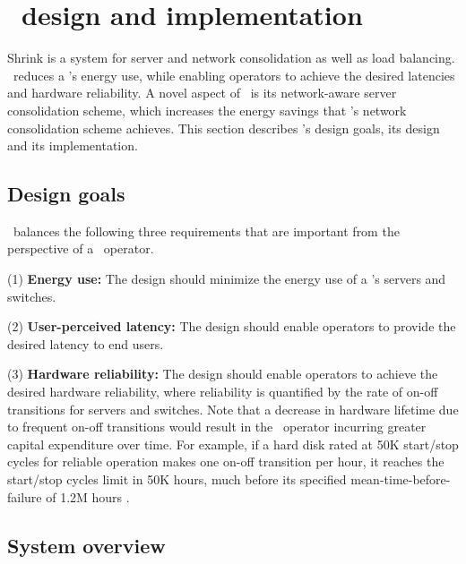 

\section{\shrink\ design and implementation}
\label{sec:shrink-design}

Shrink is a system for server and network consolidation as well as load balancing. 
\shrink\ reduces a \cdc's energy use, while enabling operators to achieve the desired latencies and hardware reliability.
A novel aspect of \shrink\ is its network-aware server consolidation scheme, which increases the energy savings that \shrink's network consolidation scheme achieves. This section describes \shrink's design goals, its design and its implementation.

\subsection{Design goals}
\shrink\  balances the following three requirements that are important from the perspective of a \cdc\ operator.

(1) \textbf{Energy use:} The design should minimize the energy use of a \cdc's servers and switches.

(2) \textbf{User-perceived latency:} The design should enable operators to provide the desired latency to end users. 

(3) \textbf{Hardware reliability:} The design should enable operators to achieve the desired hardware reliability, where reliability is quantified by the rate of on-off transitions for servers and switches. Note that a decrease in hardware lifetime due to frequent on-off transitions would result in the \cdc\ operator incurring greater capital expenditure over time. For example, if a hard disk rated at 50K start/stop cycles for reliable operation makes one on-off transition per hour, it reaches the start/stop cycles limit in 50K hours, much before its specified mean-time-before-failure of 1.2M hours \cite{seagate}.



\subsection{System overview}
\label{sec:overview}

